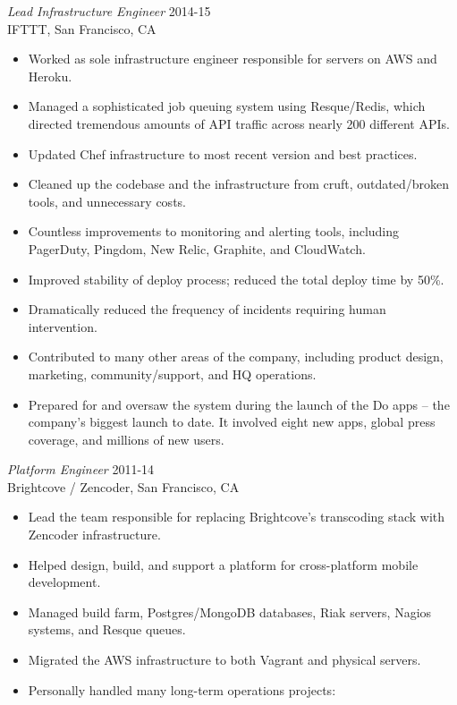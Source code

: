 \documentclass[line,margin]{res}
\begin{document}
\begin{resume}
  {\sl Lead Infrastructure Engineer}  \hfill 2014-15 \\
  IFTTT,
  San Francisco, CA
  \begin{itemize}  \itemsep -2pt %
    \item Worked as sole infrastructure engineer responsible for servers on AWS and Heroku.
    \item Managed a sophisticated job queuing system using Resque/Redis, which directed tremendous amounts of API traffic across nearly 200 different APIs.
    \item Updated Chef infrastructure to most recent version and best practices.
    \item Cleaned up the codebase and the infrastructure from cruft, outdated/broken tools, and unnecessary costs.
    \item Countless improvements to monitoring and alerting tools, including PagerDuty, Pingdom, New Relic, Graphite, and CloudWatch.
    \item Improved stability of deploy process; reduced the total deploy time by 50\%.
    \item Dramatically reduced the frequency of incidents requiring human intervention.
    \item Contributed to many other areas of the company, including product design, marketing, community/support, and HQ operations.
    \item Prepared for and oversaw the system during the launch of the Do apps -- the company's biggest launch to date. It involved eight new apps, global press coverage, and millions of new users.
  \end{itemize}

  {\sl Platform Engineer}  \hfill 2011-14 \\
  Brightcove / Zencoder,
  San Francisco, CA
  \begin{itemize}  \itemsep -2pt %
    \item Lead the team responsible for replacing Brightcove's transcoding stack with Zencoder infrastructure.
    \item Helped design, build, and support a platform for cross-platform mobile development.
    \item Managed build farm, Postgres/MongoDB databases, Riak servers, Nagios systems, and Resque queues.
    \item Migrated the AWS infrastructure to both Vagrant and physical servers.
    \item Personally handled many long-term operations projects:


\end{itemize}
\end{resume}
\end{document}
